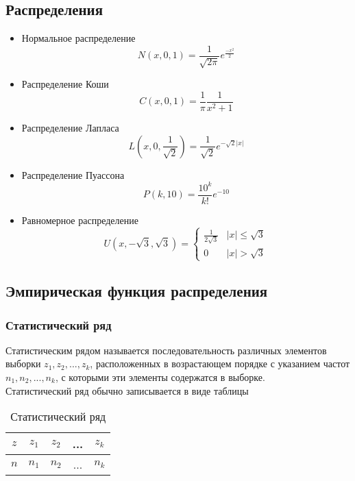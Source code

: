 \subsection{Распределения}
\begin{itemize}
\item Нормальное распределение
\begin{equation}
N(x, 0, 1)=\frac{1}{\sqrt{2\pi}}e^{\frac{-x^2}{2}}
\end{equation}
\item Распределение Коши
\begin{equation}
C(x, 0, 1)=\frac{1}{\pi}\frac{1}{x^2+1}
\end{equation}
\item Распределение Лапласа
\begin{equation}
L(x, 0, \frac{1}{\sqrt{2}})=\frac{1}{\sqrt{2}}e^{-\sqrt{2}| x |}
\end{equation}
\item Распределение Пуассона
\begin{equation}
P(k, 10)=\frac{10^k}{k!}e^{-10}
\end{equation}
\item Равномерное распределение
\begin{equation}
U(x, -\sqrt{3}, \sqrt{3})=
\left\{
  \begin{array}{lr}
    \frac{1}{2\sqrt{3}} & | x | \leq \sqrt{3}\\
    0 & | x | > \sqrt{3}
  \end{array}
\right.
\end{equation}
\end{itemize}



\subsection{Эмпирическая функция распределения}
\subsubsection{Статистический ряд}
Статистическим рядом называется последовательность различных элементов выборки \(z_1, z_2, ..., z_k\), расположенных в возрастающем порядке с указанием частот \(n_1, n_2, ..., n_k\), с которыми эти элементы содержатся в выборке.\\
Статистический ряд обычно записывается в виде таблицы

\begin{table}[!htb]
\centering
\label{tab:tab1}
\begin{tabular}{|c|c|c|c|c|}
\hline
\(z\) &\(z_1\) & \(z_2\)&...& \(z_k\)\\
\hline
\(n\) &\(n_1\) & \(n_2\)&...& \(n_k\)\\
\hline
\end{tabular}
\centering
\caption{Статистический ряд}
\end{table}


